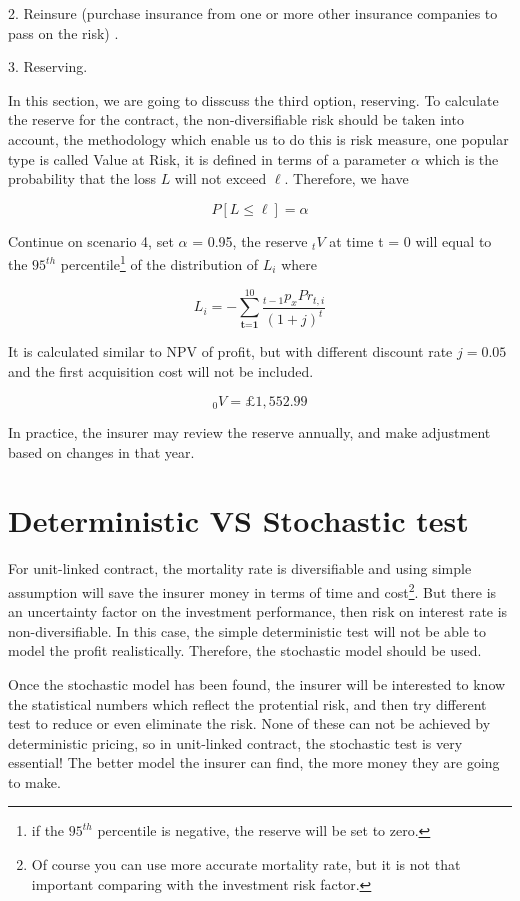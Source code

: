 \documentclass{report}
\begin{document}
{2. Reinsure (purchase insurance from one or more other insurance companies to pass on the risk) \cite{bib:reserve-wiki}.

3. Reserving.

In this section, we are going to disscuss the third option, reserving. To calculate the reserve for the contract, the non-diversifiable risk should be taken into account, the methodology which enable us to do this is risk measure\cite{bib:VaR}, one popular type is called Value at Risk, it is defined in terms of a parameter $\alpha$ which is the probability that the loss $L$ will not exceed $\ell$. Therefore, we have

\[
P[L\leq \ell] = \alpha
\]

Continue on scenario 4, set $\alpha$ = 0.95, the reserve $_tV$ at time t = 0 will equal to the $95^{th}$ percentile\footnote{if the $95^{th}$ percentile is negative, the reserve will be set to zero.} of the distribution of $L_i$ where

\[
L_i = - \sum_{\textbf{t=1}}^{10}\frac{_{t-1}p_x Pr_{t,i}}{(1+j)^t}
\]

It is calculated similar to NPV of profit, but with different discount rate $j = 0.05$ and the first acquisition cost will not be included.

\[
_0V = \pounds 1,552.99
\]


In practice, the insurer may review the reserve annually, and make adjustment based on changes in that year. 



\section{Deterministic VS Stochastic test}

For unit-linked contract, the mortality rate is diversifiable and using simple assumption will save the insurer money in terms of time and cost\footnote{Of course you can use more accurate mortality rate, but it is not that important comparing with the investment risk factor.}. But there is an uncertainty factor on the investment performance, then risk on interest rate is non-diversifiable. In this case, the simple deterministic test will not be able to model the profit realistically. Therefore, the stochastic model should be used. 

Once the stochastic model has been found, the insurer will be interested to know the statistical numbers which reflect the protential risk, and then try different test to reduce or even eliminate the risk. None of these can not be achieved by deterministic pricing, so in unit-linked contract, the stochastic test is very essential! The better model the insurer can find, the more money they are going to make.






}
\end{document}
